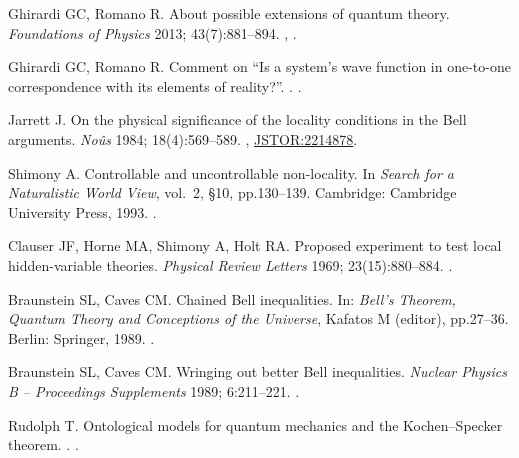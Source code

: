 \documentclass[DIV=calc,fontsize=12pt]{scrartcl} %
\theoremstyle{definition}
\theoremstyle{plain}
\begin{document}
\begin{thebibliography}{999}
Ghirardi GC, Romano R.
\newblock About possible extensions of quantum theory.
\newblock \emph{Foundations of Physics} 2013; 43(7):881--894.
\newblock \href {http://arxiv.org/abs/1301.5040} {},
\href {http://dx.doi.org/10.1007/s10701-013-9724-6}
{}.

Ghirardi GC, Romano R.
\newblock Comment on ``Is a system's wave function in one-to-one correspondence with its elements of reality?''.
.
\newblock \href {http://arxiv.org/abs/1302.1635} {}.

Jarrett J.
\newblock On the physical significance of the locality conditions in the {B}ell
arguments.
\newblock \emph{No{\^u}s} 1984; 18(4):569--589.
\newblock \href {http://dx.doi.org/10.2307/2214878}{},
\newblock \href{http://www.jstor.org/stable/2214878}{JSTOR:2214878}.

Shimony A.
\newblock Controllable and uncontrollable non-locality.
\newblock In \emph{{Search for a Naturalistic World View}}, vol.~2,
\S 10, pp.130--139. Cambridge: Cambridge University Press, 1993.
\newblock \href {http://dx.doi.org/10.1017/CBO9781139172196.010}{}.

Clauser JF, Horne MA, Shimony A, Holt RA.
\newblock Proposed experiment to test local hidden-variable theories.
\newblock \emph{Physical Review Letters} 1969; 23(15):880--884.
\newblock \href {http://dx.doi.org/10.1103/PhysRevLett.23.880}
{}.

Braunstein SL, Caves CM.
\newblock Chained Bell inequalities.
\newblock In: \emph{Bell's Theorem, Quantum Theory and Conceptions of the Universe}, Kafatos M (editor), pp.27--36. Berlin: Springer, 1989.
\newblock \href {http://dx.doi.org/10.1007/978-94-017-0849-4_5}
{}.

Braunstein SL, Caves CM.
\newblock Wringing out better Bell inequalities.
\newblock \emph{Nuclear Physics B -- Proceedings Supplements} 1989; 6:211--221.
\newblock \href{http://dx.doi.org/10.1016/0920-5632(89)90441-6}{}.

Rudolph T.
\newblock Ontological models for quantum mechanics and the Kochen--Specker theorem.
.
\newblock \href {http://arxiv.org/abs/quant-ph/0608120}
{}.


\end{thebibliography}
\end{document}
